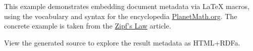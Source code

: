 \usepackage{planetmath-specials}

This example demonstrates embedding document metadata via {\LaTeX} macros, using the vocabulary and syntax for the encyclopedia \href{www.planetmath.org}{PlanetMath.org}.
The concrete example is taken from the \href{http://planetmath.org/encyclopedia/ZipfsLaw.html}{Zipf's Law} article.


View the generated source to explore the result metadata as {\color{blue}HTML+RDFa}.
